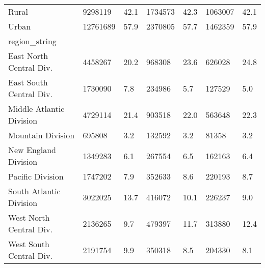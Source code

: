 \begin{tabular}{lll|ll|ll}
\midrule
Rural & 9298119 & 42.1 & 1734573 & 42.3 & 1063007 & 42.1 \\ 
Urban & 12761689 & 57.9 & 2370805 & 57.7 & 1462359 & 57.9 \\ 
\midrule
\multicolumn{1}{l}{region\_string} \\ 
\midrule
East North Central Div. & 4458267 & 20.2 & 968308 & 23.6 & 626028 & 24.8 \\ 
East South Central Div. & 1730090 & 7.8 & 234986 & 5.7 & 127529 & 5.0 \\ 
Middle Atlantic Division & 4729114 & 21.4 & 903518 & 22.0 & 563648 & 22.3 \\ 
Mountain Division & 695808 & 3.2 & 132592 & 3.2 & 81358 & 3.2 \\ 
New England Division & 1349283 & 6.1 & 267554 & 6.5 & 162163 & 6.4 \\ 
Pacific Division & 1747202 & 7.9 & 352633 & 8.6 & 220193 & 8.7 \\ 
South Atlantic Division & 3022025 & 13.7 & 416072 & 10.1 & 226237 & 9.0 \\ 
West North Central Div. & 2136265 & 9.7 & 479397 & 11.7 & 313880 & 12.4 \\ 
West South Central Div. & 2191754 & 9.9 & 350318 & 8.5 & 204330 & 8.1 \\ 
\bottomrule
\end{tabular}

